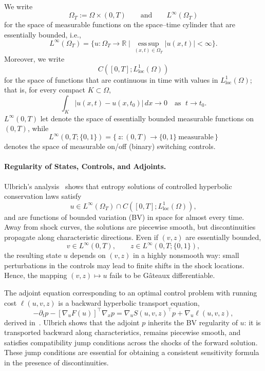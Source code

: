 \documentclass{article}
\newcommand{\1}{\mathds{1}}          %
\theoremstyle{definition}
\begin{document}
\begin{sloppypar}
We write 
\[
\Omega_T := \Omega \times (0,T)
\qquad\text{and}\qquad
L^\infty(\Omega_T)
\]
for the space of measurable functions on the space--time cylinder that are
essentially bounded, i.e.,
\[
L^\infty(\Omega_T)
=
\bigl\{
u:\Omega_T\to\mathbb{R}
\;\big|\;
\operatorname*{ess\,sup}_{(x,t)\in\Omega_T}|u(x,t)| < \infty
\bigr\}.
\]
Moreover, we write 
\[
C([0,T];L^1_{\mathrm{loc}}(\Omega))
\]
for the space of functions that are continuous in time with values in 
$L^1_{\mathrm{loc}}(\Omega)$; that is, for every compact $K\subset\Omega$,
\[
\int_K |u(x,t)-u(x,t_0)|\,dx \to 0 \quad\text{as }\; t\to t_0.
\]
$L^\infty(0,T)$ let denote the space of essentially bounded measurable functions
on $(0,T)$, while 
\[
L^\infty(0,T;\{0,1\})
= \{\,z:(0,T)\to\{0,1\}\ \text{measurable}\,\}
\]
denotes the space of measurable on/off (binary) switching controls.

\paragraph{Regularity of States, Controls, and Adjoints.} Ulbrich’s analysis~\cite{ulbrichpdeopthyper} shows that entropy solutions of controlled hyperbolic conservation laws satisfy
\[
u \in L^\infty(\Omega_T) \cap C([0,T];L^1_{\mathrm{loc}}(\Omega)),
\]
and are functions of bounded variation (BV) in space for almost every time. Away from shock curves, the solutions are piecewise smooth, but discontinuities propagate along characteristic directions.  
Even if $(v,z)$ are essentially bounded,
\[
v \in L^\infty(0,T), \qquad z\in L^\infty(0,T;\{0,1\}),
\]
the resulting state $u$ depends on $(v,z)$ in a highly nonsmooth way: small perturbations in the controls may lead to finite shifts in the shock locations. Hence, the mapping $(v,z)\mapsto u$
fails to be Gâteaux differentiable.

The adjoint equation corresponding to an optimal control problem with running cost $\ell(u,v,z)$
is a backward hyperbolic transport equation,
\[
-\partial_t p - [\nabla_u F(u)]^{\!\top}\nabla_x p
= \nabla_u S(u,v,z)^{\!\top}p + \nabla_u \ell(u,v,z),
\]
derived in~\cite{ulbrichpdeopthyper}. Ulbrich shows that the adjoint $p$ inherits the BV regularity of $u$: it is transported backward
along characteristics, remains piecewise smooth, and satisfies compatibility jump conditions across
the shocks of the forward solution. These jump conditions are essential for obtaining a consistent
sensitivity formula in the presence of discontinuities.


\end{sloppypar}
\end{document}
